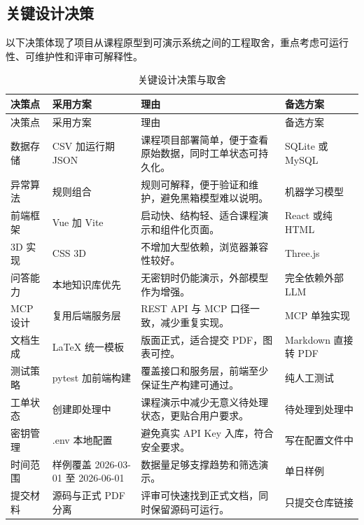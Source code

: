 \documentclass[12pt,a4paper]{ctexart}
\begin{document}
\subsection{关键设计决策}
以下决策体现了项目从课程原型到可演示系统之间的工程取舍，重点考虑可运行性、可维护性和评审可解释性。
\begin{longtable}{L{3.2cm}L{4.3cm}L{4.8cm}L{3.0cm}}
\caption{关键设计决策与取舍}\\
\toprule
决策点 & 采用方案 & 理由 & 备选方案 \\
\midrule
\endfirsthead
\toprule
决策点 & 采用方案 & 理由 & 备选方案 \\
\midrule
\endhead
数据存储 & CSV 加运行期 JSON & 课程项目部署简单，便于查看原始数据，同时工单状态可持久化。 & SQLite 或 MySQL \\
异常算法 & 规则组合 & 规则可解释，便于验证和维护，避免黑箱模型难以说明。 & 机器学习模型 \\
前端框架 & Vue 加 Vite & 启动快、结构轻、适合课程演示和组件化页面。 & React 或纯 HTML \\
3D 实现 & CSS 3D & 不增加大型依赖，浏览器兼容性较好。 & Three.js \\
问答能力 & 本地知识库优先 & 无密钥时仍能演示，外部模型作为增强。 & 完全依赖外部 LLM \\
MCP 设计 & 复用后端服务层 & REST API 与 MCP 口径一致，减少重复实现。 & MCP 单独实现 \\
文档生成 & LaTeX 统一模板 & 版面正式，适合提交 PDF，图表可控。 & Markdown 直接转 PDF \\
测试策略 & pytest 加前端构建 & 覆盖接口和服务层，前端至少保证生产构建可通过。 & 纯人工测试 \\
工单状态 & 创建即处理中 & 课程演示中减少无意义待处理状态，更贴合用户要求。 & 待处理到处理中 \\
密钥管理 & .env 本地配置 & 避免真实 API Key 入库，符合安全要求。 & 写在配置文件中 \\
时间范围 & 样例覆盖 2026-03-01 至 2026-06-01 & 数据量足够支撑趋势和筛选演示。 & 单日样例 \\
提交材料 & 源码与正式 PDF 分离 & 评审可快速找到正式文档，同时保留源码可运行。 & 只提交仓库链接 \\
\bottomrule
\end{longtable}
\end{document}
